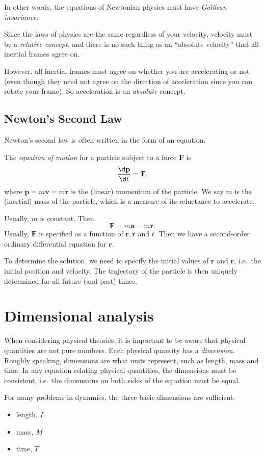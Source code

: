 \documentclass[a4paper]{article}
\begin{document}
In other words, the equations of Newtonian physics must have \emph{Galilean invariance}.

Since the laws of physics are the same regardless of your velocity, velocity must be a \emph{relative concept}, and there is no such thing as an ``absolute velocity'' that all inertial frames agree on.

However, all inertial frames must agree on whether you are accelerating or not (even though they need not agree on the direction of acceleration since you can rotate your frame). So acceleration is an \emph{absolute} concept.

\subsection{Newton's Second Law}
Newton's second law is often written in the form of an equation.
\begin{law}
  The \emph{equation of motion} for a particle subject to a force $\mathbf{F}$ is
  \[
    \frac{\d \mathbf{p}}{\d t} = \mathbf{F},
  \]
  where $\mathbf{p} = m\mathbf{v} = m\dot{\mathbf{r}}$ is the (linear) momentum of the particle. We say $m$ is the (inertial) mass of the particle, which is a measure of its reluctance to accelerate.
\end{law}

Usually, $m$ is constant. Then
\[
  \mathbf{F} = m\mathbf{a} = m\ddot{\mathbf{r}}.
\]
Usually, $\mathbf{F}$ is specified as a function of $\mathbf{r}, \dot{\mathbf{r}}$ and $t$. Then we have a second-order ordinary differential equation for $\mathbf{r}$.

To determine the solution, we need to specify the initial values of $\mathbf{r}$ and $\dot{\mathbf{r}}$, i.e.\ the initial position and velocity. The trajectory of the particle is then uniquely determined for all future (and past) times.

\section{Dimensional analysis}
When considering physical theories, it is important to be aware that physical quantities are not pure numbers. Each physical quantity has a \emph{dimension}. Roughly speaking, dimensions are what units represent, such as length, mass and time. In any equation relating physical quantities, the dimensions must be consistent, i.e.\ the dimensions on both sides of the equation must be equal.

For many problems in dynamics, the three basic dimensions are sufficient:
\begin{itemize}
  \item length, $L$
  \item mass, $M$
  \item time, $T$
\end{itemize}
\end{document}
